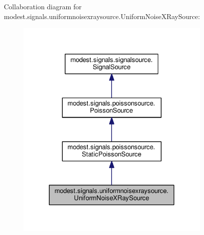 Collaboration diagram for modest.\+signals.\+uniformnoisexraysource.\+Uniform\+Noise\+X\+Ray\+Source\+:
\nopagebreak
\begin{figure}[H]
\begin{center}
\leavevmode
\includegraphics[width=272pt]{classmodest_1_1signals_1_1uniformnoisexraysource_1_1UniformNoiseXRaySource__coll__graph}
\end{center}
\end{figure}
